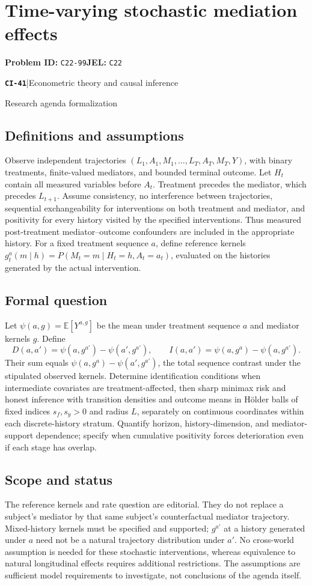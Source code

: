 \documentclass[11pt,a4paper]{article}
\newcommand{\E}{\mathbb E}
\newcommand{\entrymeta}[3]{{\sffamily\small\color{muted}\textbf{\texttt{#1}}\quad|\quad #2\par #3\par}}
\begin{document}
\section*{Time-varying stochastic mediation effects}
\textbf{Problem ID:} \texttt{C22-99}\quad \textbf{JEL:} \texttt{C22}\par
\label{problem:OP-0520}
\label{beyond:CI-41}
\entrymeta{CI-41}{Econometric theory and causal inference}{Research agenda formalization}
\subsection*{Definitions and assumptions}
Observe independent trajectories $(L_1,A_1,M_1,\ldots,L_T,A_T,M_T,Y)$, with binary treatments, finite-valued mediators, and bounded terminal outcome. Let $H_t$ contain all measured variables before $A_t$. Treatment precedes the mediator, which precedes $L_{t+1}$. Assume consistency, no interference between trajectories, sequential exchangeability for interventions on both treatment and mediator, and positivity for every history visited by the specified interventions. Thus measured post-treatment mediator--outcome confounders are included in the appropriate history. For a fixed treatment sequence $a$, define reference kernels $g_t^a(m\mid h)=P(M_t=m\mid H_t=h,A_t=a_t)$, evaluated on the histories generated by the actual intervention.
\subsection*{Formal question}
Let $\psi(a,g)=\E[Y^{a,g}]$ be the mean under treatment sequence $a$ and mediator kernels $g$. Define
\[
 D(a,a')=\psi(a,g^{a'})-\psi(a',g^{a'}),\qquad
 I(a,a')=\psi(a,g^a)-\psi(a,g^{a'}).
\]
Their sum equals $\psi(a,g^a)-\psi(a',g^{a'})$, the total sequence contrast under the stipulated observed kernels. Determine identification conditions when intermediate covariates are treatment-affected, then sharp minimax risk and honest inference with transition densities and outcome means in H\"older balls of fixed indices $s_f,s_y>0$ and radius $L$, separately on continuous coordinates within each discrete-history stratum. Quantify horizon, history-dimension, and mediator-support dependence; specify when cumulative positivity forces deterioration even if each stage has overlap.
\subsection*{Scope and status}
The reference kernels and rate question are editorial. They do not replace a subject's mediator by that same subject's counterfactual mediator trajectory. Mixed-history kernels must be specified and supported; $g^{a'}$ at a history generated under $a$ need not be a natural trajectory distribution under $a'$. No cross-world assumption is needed for these stochastic interventions, whereas equivalence to natural longitudinal effects requires additional restrictions. The assumptions are sufficient model requirements to investigate, not conclusions of the agenda itself.
\end{document}
